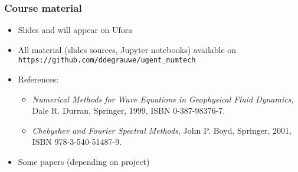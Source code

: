 \documentclass[aspectratio=43,9pt]{beamer}
\begin{document}
%
%
\begin{frame}
	\frametitle{Course material}
	\vspace*{-5mm}
	\begin{itemize}
		\item Slides and will appear on Ufora\vspace*{3ex}
		\item All material (slides sources, Jupyter notebooks) available on \texttt{https://github.com/ddegrauwe/ugent_numtech}\vspace*{3ex}
		\item References:\vspace*{2ex}
			\begin{itemize}
				\item \emph{Numerical Methods for Wave Equations in Geophysical Fluid Dynamics},\\ Dale R. Durran, Springer, 1999, ISBN 0-387-98376-7.\vspace*{2ex}
				\item \emph{Chebyshev and Fourier Spectral Methods}, John P. Boyd, Springer, 2001, ISBN 978-3-540-51487-9.\vspace*{3ex}
			\end{itemize}
		\item Some papers (depending on project)
	\end{itemize}
\end{frame}
%
%
\end{document}
